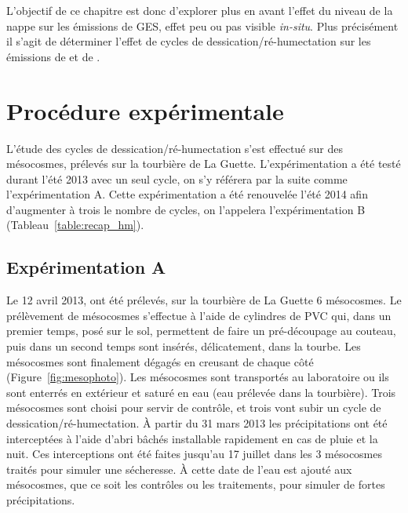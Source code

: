 L'objectif de ce chapitre est donc d'explorer plus en avant l'effet du niveau de la nappe sur les émissions de GES, effet peu ou pas visible \textit{in-situ}.
Plus précisément il s'agit de déterminer l'effet de cycles de dessication/ré-humectation sur les émissions de \coo et de \chh. 

\section{Procédure expérimentale}

L'étude des cycles de dessication/ré-humectation s'est effectué sur des mésocosmes, prélevés sur la tourbière de La Guette.
L'expérimentation a été testé durant l'été 2013 avec un seul cycle, on s'y référera par la suite comme l'expérimentation A.
Cette expérimentation a été renouvelée l'été 2014 afin d'augmenter à trois le nombre de cycles, on l'appelera l'expérimentation B (Tableau~\ref{table:recap_hm}).

\subsection{Expérimentation A}
Le 12 avril 2013, ont été prélevés, sur la tourbière de La Guette 6 mésocosmes.
Le prélèvement de mésocosmes s'effectue à l'aide de cylindres de PVC qui, dans un premier temps, posé sur le sol, permettent de faire un pré-découpage au couteau, puis dans un second temps sont insérés, délicatement, dans la tourbe. 
Les mésocosmes sont finalement dégagés en creusant de chaque côté (Figure~\ref{fig:mesophoto}).
Les mésocosmes sont transportés au laboratoire ou ils sont enterrés en extérieur et saturé en eau (eau prélevée dans la tourbière).
Trois mésocosmes sont choisi pour servir de contrôle, et trois vont subir un cycle de dessication/ré-humectation.
À partir du 31 mars 2013 les précipitations ont été interceptées à l'aide d'abri bâchés installable rapidement en cas de pluie et la nuit.
Ces interceptions ont été faites jusqu'au 17 juillet dans les 3 mésocosmes traités pour simuler une sécheresse.
À cette date de l'eau est ajouté aux mésocosmes, que ce soit les contrôles ou les traitements, pour simuler de fortes précipitations.

